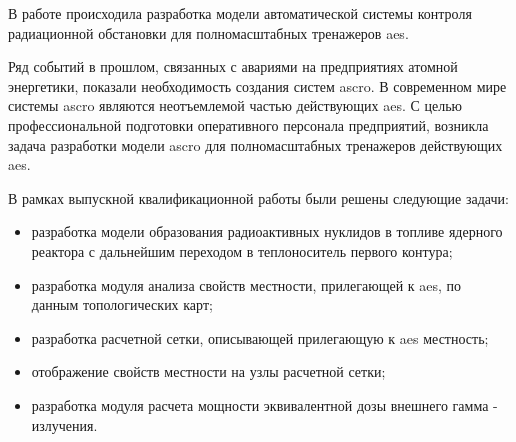 
В работе происходила разработка модели автоматической системы контроля радиационной обстановки для полномасштабных 
тренажеров \ac{aes}. 

Ряд событий в прошлом, связанных с авариями на предприятиях атомной энергетики, показали необходимость создания систем 
\ac{ascro}. В современном мире системы \ac{ascro} являются неотъемлемой частью действующих \ac{aes}. С целью 
профессиональной подготовки оперативного персонала предприятий, возникла задача разработки модели 
\ac{ascro} для полномасштабных тренажеров действующих \ac{aes}.

В рамках выпускной квалификационной работы были решены следующие задачи:

\begin{itemize}
  \item разработка модели образования радиоактивных нуклидов в топливе ядерного реактора с дальнейшим переходом в 
  	теплоноситель первого контура;
  \item разработка модуля анализа свойств местности, прилегающей к \ac{aes}, по данным топологических карт;
  \item разработка расчетной сетки, описывающей прилегающую к \ac{aes} местность;
  \item отображение свойств местности на узлы расчетной сетки;
  \item разработка модуля расчета мощности эквивалентной дозы внешнего гамма - излучения.
\end{itemize}
